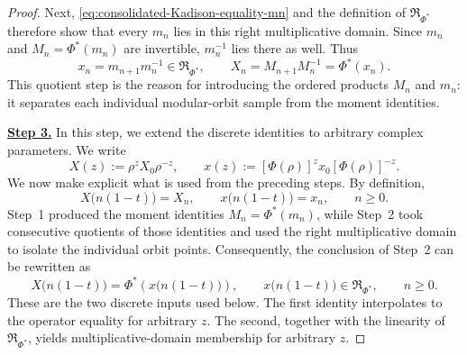 \documentclass[11pt]{article}
\theoremstyle{remark}
\newcommand{\1}{\mathbbm{1}}
\begin{document}
\begin{proof}
Next, \eqref{eq:consolidated-Kadison-equality-mn} and the definition of
$\mathfrak R_{\Phi^*}$ therefore show that every $m_n$ lies in this
right multiplicative domain.  Since $m_n$ and
$M_n=\Phi^*(m_n)$ are invertible, $m_n^{-1}$ lies there as well.
Thus
\begin{equation}
 x_n=m_{n+1}m_n^{-1}\in\mathfrak R_{\Phi^*},\qquad
 X_n=M_{n+1}M_n^{-1}=\Phi^*(x_n).
\end{equation}
This quotient step is the reason for introducing the ordered products
$M_n$ and $m_n$: it separates each individual modular-orbit sample
from the moment identities.

\smallskip
\noindent\underline{\textbf{Step 3.}}\enspace
In this step, we extend the discrete identities to arbitrary complex
parameters.  We write
\begin{equation}
 X(z):=\rho^zX_0\rho^{-z},\qquad
 x(z):=[\Phi(\rho)]^zx_0[\Phi(\rho)]^{-z}.
\end{equation}
We now make explicit what is used from the preceding steps.
By definition,
\[
 X\bigl(n(1-t)\bigr)=X_n,\qquad
 x\bigl(n(1-t)\bigr)=x_n,\qquad n\geq0.
\]
Step~1 produced the moment identities
$M_n=\Phi^*(m_n)$, while Step~2 took consecutive quotients of those
identities and used the right multiplicative domain to isolate the
individual orbit points.  Consequently, the conclusion of Step~2 can
be rewritten as
\begin{equation}
 X\bigl(n(1-t)\bigr)
 =\Phi^*\!\left(x\bigl(n(1-t)\bigr)\right),
 \qquad
 x\bigl(n(1-t)\bigr)\in\mathfrak R_{\Phi^*},
 \qquad n\geq0.
 \label{eq:consolidated-discrete-orbit-input}
\end{equation}
These are the two discrete inputs used below.  The first identity
interpolates to the operator equality for arbitrary $z$.  The second,
together with the linearity of $\mathfrak R_{\Phi^*}$, yields
multiplicative-domain membership for arbitrary $z$.


\end{proof}
\end{document}
